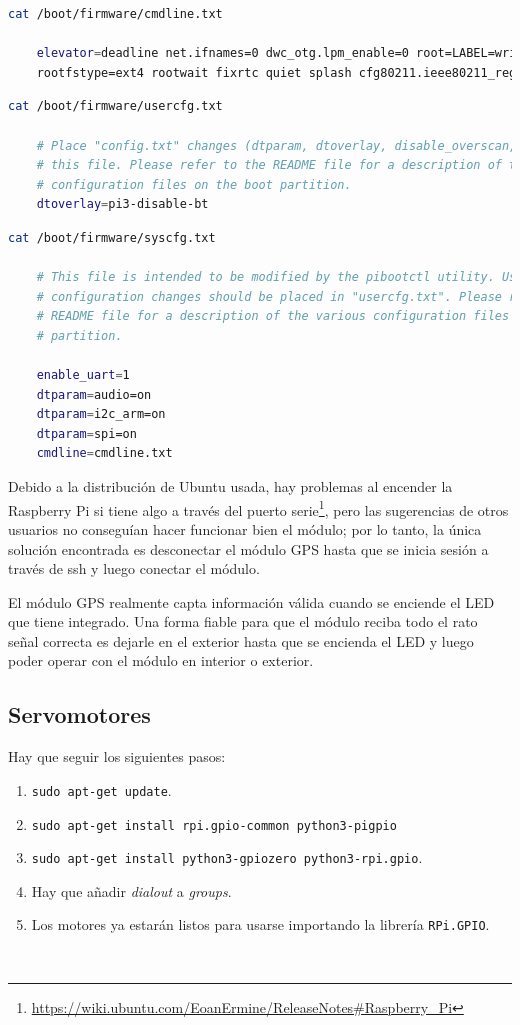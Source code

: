 \begin{lstlisting}[language=bash]
	cat /boot/firmware/cmdline.txt 
	
	elevator=deadline net.ifnames=0 dwc_otg.lpm_enable=0 root=LABEL=writable \
	rootfstype=ext4 rootwait fixrtc quiet splash cfg80211.ieee80211_regdom=GB
\end{lstlisting}

\begin{lstlisting}[language=bash]
	cat /boot/firmware/usercfg.txt 
	
	# Place "config.txt" changes (dtparam, dtoverlay, disable_overscan, etc.) in
	# this file. Please refer to the README file for a description of the various
	# configuration files on the boot partition.
	dtoverlay=pi3-disable-bt
\end{lstlisting}

\begin{lstlisting}[language=bash]
	cat /boot/firmware/syscfg.txt 
	
	# This file is intended to be modified by the pibootctl utility. User
	# configuration changes should be placed in "usercfg.txt". Please refer to the
	# README file for a description of the various configuration files on the boot
	# partition.
	
	enable_uart=1
	dtparam=audio=on
	dtparam=i2c_arm=on
	dtparam=spi=on
	cmdline=cmdline.txt	
\end{lstlisting}


Debido a la distribución de Ubuntu usada, hay problemas al encender la Raspberry Pi si tiene algo a través del puerto serie\footnote{\url{https://wiki.ubuntu.com/EoanErmine/ReleaseNotes\#Raspberry_Pi}}, pero las sugerencias de otros usuarios no conseguían hacer funcionar bien el módulo; por lo tanto, la única solución encontrada es desconectar el módulo \acs{GPS} hasta que se inicia sesión a través de ssh y luego conectar el módulo.

El módulo GPS realmente capta información válida cuando se enciende el LED que tiene integrado. Una forma fiable para que el módulo reciba todo el rato señal correcta es dejarle en el exterior hasta que se encienda el LED y luego poder operar con el módulo en interior o exterior. 

\subsection{Servomotores}
\label{subsec:anexomotores}

Hay que seguir los siguientes pasos:

\begin{enumerate}
	\item \verb|sudo apt-get update|.
	\item \verb|sudo apt-get install rpi.gpio-common python3-pigpio|
	\item \verb|sudo apt-get install python3-gpiozero python3-rpi.gpio|.
	\item Hay que añadir \textit{dialout} a \textit{groups}.
	\item Los motores ya estarán listos para usarse importando la librería \verb|RPi.GPIO|.
\end{enumerate}\

